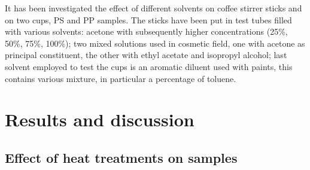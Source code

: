 \documentclass[a4paper, 11pt]{article}
\begin{document}
It has been investigated the effect of different solvents on coffee stirrer sticks and on two cups, PS and PP samples. The sticks have been put in test tubes filled with various solvents: acetone with subsequently higher concentrations (25\%, 50\%, 75\%, 100\%); two mixed solutions used in cosmetic field, one with acetone as principal constituent, the other with ethyl acetate and isopropyl alcohol; last solvent employed to test the cups is an aromatic diluent used with paints, this contains various mixture, in particular a percentage of toluene.

\section{Results and discussion}

\subsection{Effect of heat treatments on samples}
\end{document}
